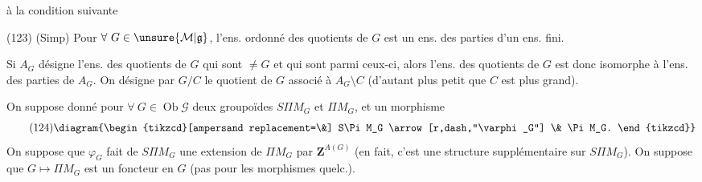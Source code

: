 à la condition suivante

(123) (Simp) Pour $\forall\ G\in\unsure{\mathcal M|\mathfrak g}$, l'ens. ordonné des quotients  de $G$ est   un ens. des parties d'un ens. fini.

Si $A_G$ désigne l'ens. des quotients de $G$ qui sont $\ne G$ et qui sont  parmi ceux-ci, alors l'ens.  des quotients de $G$ est donc isomorphe à l'ens. des parties de $A_G$.  On désigne par $G/C$ le quotient de $G$ associé à $A_G\setminus C$ (d'autant plus petit que $C$ est plus grand).


On suppose donné pour $\forall\ G\in\operatorname{Ob}\mathcal G$ deux groupoïdes $S\Pi M_G$ et $\Pi M_G$, et un morphisme
\[
\tag{124}
\diagram{\begin{tikzcd}[ampersand replacement=\&]
S\Pi M_G \arrow[r,dash,"\varphi_G"] \& \Pi M_G.
\end{tikzcd}}
\]
On suppose que $\varphi_G$ fait de $S\Pi M_G$ une extension de $\Pi M_G$ par $\mathbf Z^{A(G)}$ (en fait, c'est une structure supplémentaire sur $S\Pi M_G$). On suppose que $G\mapsto\Pi M_G$ est un foncteur en $G$  (pas pour les morphismes quelc.).
